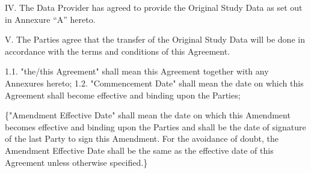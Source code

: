\documentclass[12pt,letterpaper]{article}
\newcommand{\added}[1]{\textcolor{addcolor}{#1}}
\begin{document}
IV.	The Data Provider has agreed to provide the Original Study Data as set out in Annexure “A” hereto.

V.	The Parties agree that the transfer of the Original Study Data will be done in accordance with the terms and conditions of this Agreement. 

1.1.	"the/this Agreement" shall mean this Agreement together with any Annexures hereto; 1.2. "Commencement Date" shall mean the date on which this Agreement shall become effective and binding upon the Parties;

\added\{"Amendment Effective Date" shall mean the date on which this Amendment becomes effective and binding upon the Parties and shall be the date of signature of the last Party to sign this Amendment. For the avoidance of doubt, the Amendment Effective Date shall be the same as the effective date of this Agreement unless otherwise specified.\}
\end{document}
